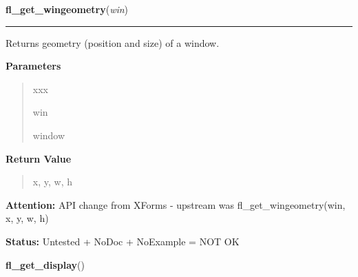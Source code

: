 \hspace{.8\funcindent}\begin{boxedminipage}{\funcwidth}

    \raggedright \textbf{fl\_get\_wingeometry}(\textit{win})

    \vspace{-1.5ex}

    \rule{\textwidth}{0.5\fboxrule}
\setlength{\parskip}{2ex}
    Returns geometry (position and size) of a window.

\setlength{\parskip}{1ex}
      \textbf{Parameters}
      \vspace{-1ex}

      \begin{quote}
        \begin{Ventry}{xxx}

          \item[win]

          window

        \end{Ventry}

      \end{quote}

      \textbf{Return Value}
    \vspace{-1ex}

      \begin{quote}
      x, y, w, h

      \end{quote}

\textbf{Attention:} API change from XForms - upstream was fl\_get\_wingeometry(win, x, y, w, h)



\textbf{Status:} Untested + NoDoc + NoExample = NOT OK



    \end{boxedminipage}

    \label{xformslib:library:fl_get_display}

    \vspace{0.5ex}

\hspace{.8\funcindent}\begin{boxedminipage}{\funcwidth}

    \raggedright \textbf{fl\_get\_display}()

\setlength{\parskip}{2ex}
\setlength{\parskip}{1ex}
    \end{boxedminipage}

